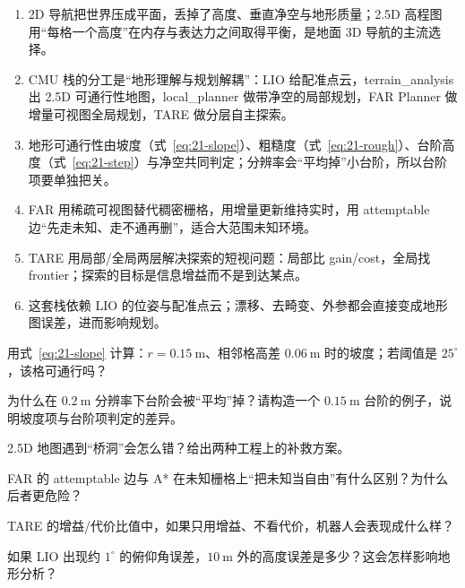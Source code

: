 \begin{summary}

\begin{enumerate}
  \item 2D 导航把世界压成平面，丢掉了高度、垂直净空与地形质量；2.5D 高程图用“每格一个高度”在内存与表达力之间取得平衡，是地面 3D 导航的主流选择。
  \item CMU 栈的分工是“地形理解与规划解耦”：LIO 给配准点云，terrain\_analysis 出 2.5D 可通行性地图，local\_planner 做带净空的局部规划，FAR Planner 做增量可视图全局规划，TARE 做分层自主探索。
  \item 地形可通行性由坡度（式~\eqref{eq:21-slope}）、粗糙度（式~\eqref{eq:21-rough}）、台阶高度（式~\eqref{eq:21-step}）与净空共同判定；分辨率会“平均掉”小台阶，所以台阶项要单独把关。
  \item FAR 用稀疏可视图替代稠密栅格，用增量更新维持实时，用 attemptable 边“先走未知、走不通再删”，适合大范围未知环境。
  \item TARE 用局部/全局两层解决探索的短视问题：局部比 gain/cost，全局找 frontier；探索的目标是信息增益而不是到达某点。
  \item 这套栈依赖 LIO 的位姿与配准点云；漂移、去畸变、外参都会直接变成地形图误差，进而影响规划。
\end{enumerate}


\end{summary}

\begin{problemset}

  \item 用式~\eqref{eq:21-slope} 计算：$r=0.15\ \mathrm{m}$、相邻格高差 $0.06\ \mathrm{m}$ 时的坡度；若阈值是 $25^\circ$，该格可通行吗？
  \item 为什么在 $0.2\ \mathrm{m}$ 分辨率下台阶会被“平均”掉？请构造一个 $0.15\ \mathrm{m}$ 台阶的例子，说明坡度项与台阶项判定的差异。
  \item 2.5D 地图遇到“桥洞”会怎么错？给出两种工程上的补救方案。
  \item FAR 的 attemptable 边与 A* 在未知栅格上“把未知当自由”有什么区别？为什么后者更危险？
  \item TARE 的增益/代价比值中，如果只用增益、不看代价，机器人会表现成什么样？
  \item 如果 LIO 出现约 $1^\circ$ 的俯仰角误差，$10\ \mathrm{m}$ 外的高度误差是多少？这会怎样影响地形分析？
\end{problemset}

